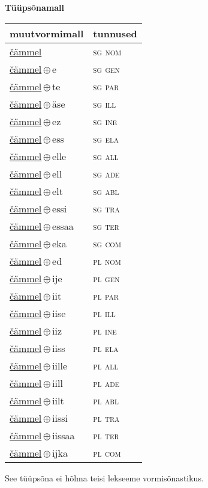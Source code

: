 

\vspace{3.5em}
\noindent \begin{minipage}{\textwidth}
\noindent \textbf{Tüüpsõnamall \,}\\

\begin{sideways}
\begin{tabular}{l l}
muutvormimall & tunnused \\
\hline
\underline{čämmel} & \textsc{ sg nom } \\
\underline{čämmel}\,$\oplus$\,e & \textsc{ sg gen } \\
\underline{čämmel}\,$\oplus$\,te & \textsc{ sg par } \\
\underline{čämmel}\,$\oplus$\,äse & \textsc{ sg ill } \\
\underline{čämmel}\,$\oplus$\,ez & \textsc{ sg ine } \\
\underline{čämmel}\,$\oplus$\,ess & \textsc{ sg ela } \\
\underline{čämmel}\,$\oplus$\,elle & \textsc{ sg all } \\
\underline{čämmel}\,$\oplus$\,ell & \textsc{ sg ade } \\
\underline{čämmel}\,$\oplus$\,elt & \textsc{ sg abl } \\
\underline{čämmel}\,$\oplus$\,essi & \textsc{ sg tra } \\
\underline{čämmel}\,$\oplus$\,essaa & \textsc{ sg ter } \\
\underline{čämmel}\,$\oplus$\,eka & \textsc{ sg com } \\
\underline{čämmel}\,$\oplus$\,ed & \textsc{ pl nom } \\
\underline{čämmel}\,$\oplus$\,ije & \textsc{ pl gen } \\
\underline{čämmel}\,$\oplus$\,iit & \textsc{ pl par } \\
\underline{čämmel}\,$\oplus$\,iise & \textsc{ pl ill } \\
\underline{čämmel}\,$\oplus$\,iiz & \textsc{ pl ine } \\
\underline{čämmel}\,$\oplus$\,iiss & \textsc{ pl ela } \\
\underline{čämmel}\,$\oplus$\,iille & \textsc{ pl all } \\
\underline{čämmel}\,$\oplus$\,iill & \textsc{ pl ade } \\
\underline{čämmel}\,$\oplus$\,iilt & \textsc{ pl abl } \\
\underline{čämmel}\,$\oplus$\,iissi & \textsc{ pl tra } \\
\underline{čämmel}\,$\oplus$\,iissaa & \textsc{ pl ter } \\
\underline{čämmel}\,$\oplus$\,ijka & \textsc{ pl com } \\
\end{tabular}
\end{sideways}
\label{tab:tüüpsõnamall-čämmel}

\end{minipage}

 
\vspace{1em}
\noindent See tüüpsõna ei hõlma teisi lekseeme vormi\-sõnastikus.
